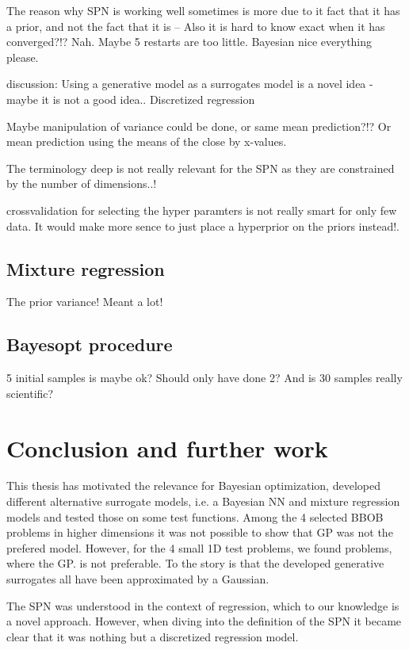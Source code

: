 The reason why SPN is working well sometimes is more due to it fact that it has a prior, 
and not the fact that it is -- Also it is hard to know exact when it has converged?!? Nah. 
Maybe 5 restarts are too little. Bayesian nice everything please. 


discussion: Using a generative model as a surrogates model is a novel idea - maybe it is not a good
idea.. Discretized regression

Maybe manipulation of variance could be done, or same mean prediction?!? Or 
mean prediction using the means of the close by x-values. 

The terminology deep is not really relevant for the SPN as they are constrained by the number of dimensions..!

crossvalidation for selecting the hyper paramters is not really smart for only few data. It would make more sence 
to just place a hyperprior on the priors instead!. 

\section{Mixture regression}
The prior variance! Meant a lot!



\section{Bayesopt procedure}
5 initial samples is maybe ok? Should only have done 2? 
And is 30 samples really scientific? 



\chapter{Conclusion and further work}


This thesis has motivated the relevance for Bayesian optimization, developed different alternative
surrogate models, i.e. a Bayesian NN and mixture regression models and tested those on some 
test functions. Among the 4 selected BBOB problems in higher dimensions it was not possible to show that
GP was not the prefered model. However, for the 4 small 1D test problems, we found problems, where the GP. 
is not preferable. To the story is that the developed generative surrogates all have been approximated by
a Gaussian. 

The SPN was understood in the context of regression, which to our knowledge is a novel approach. However, 
when diving into the definition of the SPN it became clear that it was nothing but a discretized regression model. 

